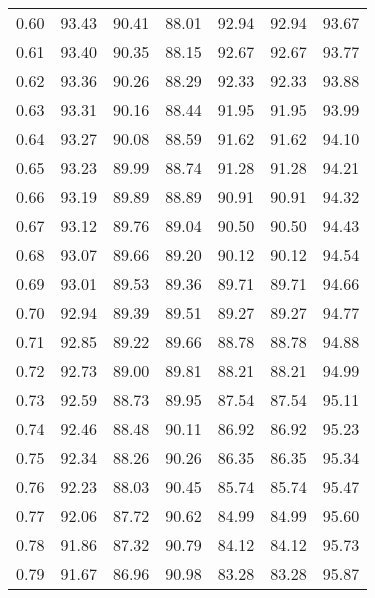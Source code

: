 \begin{tabular}{|c|c|c|c|c|c|c|}
      0.60 &     93.43 &     90.41 &      88.01 &   92.94 &      92.94 &         93.67 \\
      0.61 &     93.40 &     90.35 &      88.15 &   92.67 &      92.67 &         93.77 \\
      0.62 &     93.36 &     90.26 &      88.29 &   92.33 &      92.33 &         93.88 \\
      0.63 &     93.31 &     90.16 &      88.44 &   91.95 &      91.95 &         93.99 \\
      0.64 &     93.27 &     90.08 &      88.59 &   91.62 &      91.62 &         94.10 \\
      0.65 &     93.23 &     89.99 &      88.74 &   91.28 &      91.28 &         94.21 \\
      0.66 &     93.19 &     89.89 &      88.89 &   90.91 &      90.91 &         94.32 \\
      0.67 &     93.12 &     89.76 &      89.04 &   90.50 &      90.50 &         94.43 \\
      0.68 &     93.07 &     89.66 &      89.20 &   90.12 &      90.12 &         94.54 \\
      0.69 &     93.01 &     89.53 &      89.36 &   89.71 &      89.71 &         94.66 \\
      0.70 &     92.94 &     89.39 &      89.51 &   89.27 &      89.27 &         94.77 \\
      0.71 &     92.85 &     89.22 &      89.66 &   88.78 &      88.78 &         94.88 \\
      0.72 &     92.73 &     89.00 &      89.81 &   88.21 &      88.21 &         94.99 \\
      0.73 &     92.59 &     88.73 &      89.95 &   87.54 &      87.54 &         95.11 \\
      0.74 &     92.46 &     88.48 &      90.11 &   86.92 &      86.92 &         95.23 \\
      0.75 &     92.34 &     88.26 &      90.26 &   86.35 &      86.35 &         95.34 \\
      0.76 &     92.23 &     88.03 &      90.45 &   85.74 &      85.74 &         95.47 \\
      0.77 &     92.06 &     87.72 &      90.62 &   84.99 &      84.99 &         95.60 \\
      0.78 &     91.86 &     87.32 &      90.79 &   84.12 &      84.12 &         95.73 \\
      0.79 &     91.67 &     86.96 &      90.98 &   83.28 &      83.28 &         95.87 \\

\end{tabular}
